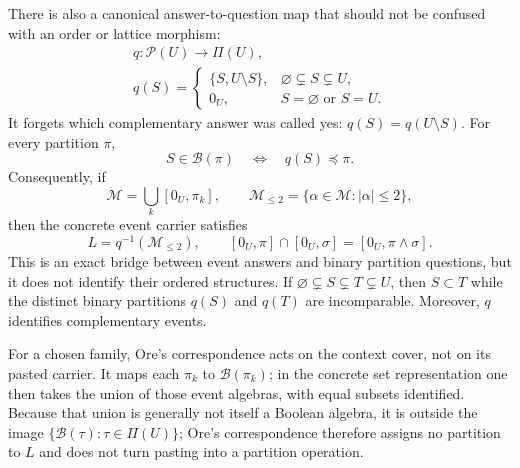 \documentclass[aps,pra,reprint,nofootinbib]{revtex4-2}
\newcommand{\Pow}{\mathcal{P}}
\newcommand{\Part}{\Pi}
\newcommand{\BA}{\mathcal{B}}
\begin{document}
There is also a canonical answer-to-question map that should not be confused
with an order or lattice morphism:
\begin{equation}
  \begin{gathered}
  q:\Pow(U)\longrightarrow\Part(U),\\
  q(S)=
    \begin{cases}
      \{S,U\setminus S\},&\varnothing\subsetneq S\subsetneq U,\\
      0_U,&S=\varnothing\text{ or }S=U.
    \end{cases}
  \end{gathered}
  \label{eq:answer-question-map}
\end{equation}
It forgets which complementary answer was called yes:
$q(S)=q(U\setminus S)$.  For every partition $\pi$,
\begin{equation}
  S\in\BA(\pi)
  \quad\Longleftrightarrow\quad
  q(S)\preceq\pi.
  \label{eq:event-binary-question}
\end{equation}
Consequently, if
\begin{equation}
  \mathcal M=\bigcup_k[0_U,\pi_k],\qquad
  \mathcal M_{\leq2}
  =\{\alpha\in\mathcal M:|\alpha|\leq2\},
  \label{eq:selected-partition-cover}
\end{equation}
then the concrete event carrier satisfies
\begin{equation}
  L=q^{-1}(\mathcal M_{\leq2}),
  \qquad
  [0_U,\pi]\cap[0_U,\sigma]=[0_U,\pi\wedge\sigma].
  \label{eq:event-preimage-and-interval-overlap}
\end{equation}
This is an exact bridge between event answers and binary partition questions,
but it does not identify their ordered structures.  If
$\varnothing\subsetneq S\subsetneq T\subsetneq U$, then $S\subset T$ while
the distinct binary partitions $q(S)$ and $q(T)$ are incomparable.  Moreover,
$q$ identifies complementary events.

For a chosen family, Ore's correspondence acts on the context cover, not on
its pasted carrier.  It maps each $\pi_k$ to $\BA(\pi_k)$; in the concrete set
representation one then takes the union of those event algebras, with equal
subsets identified.  Because that union is generally not itself a Boolean
algebra, it is outside the image $\{\BA(\tau):\tau\in\Part(U)\}$; Ore's
correspondence therefore assigns no partition to $L$ and does not turn pasting
into a partition operation.
\end{document}
